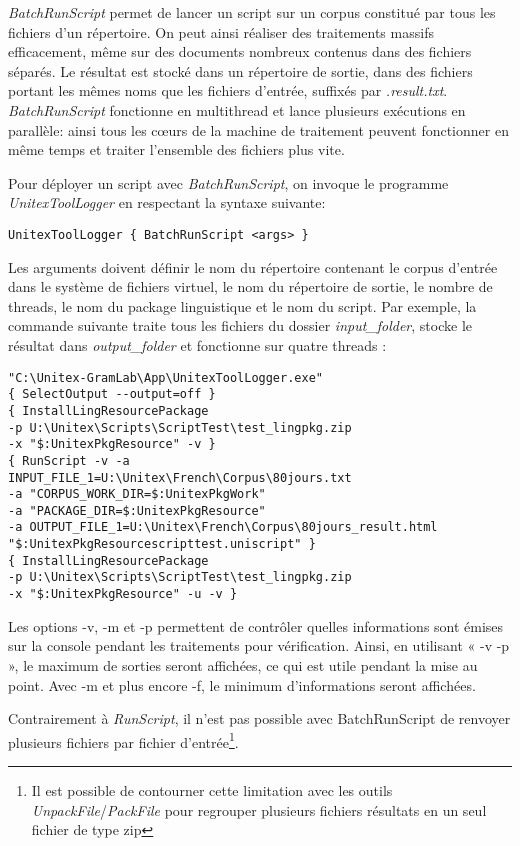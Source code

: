 \emph{BatchRunScript} permet de lancer un script sur un corpus constitué par tous les fichiers d'un répertoire. On peut ainsi réaliser des traitements massifs efficacement, même sur des documents nombreux contenus dans des fichiers séparés. Le résultat est stocké dans un répertoire de sortie, dans des fichiers portant les mêmes noms que les fichiers d'entrée, suffixés par \emph{.result.txt}. \emph{BatchRunScript} fonctionne en multithread et lance plusieurs exécutions en parallèle: ainsi tous les cœurs de la machine de traitement peuvent fonctionner en même temps et traiter l’ensemble des fichiers plus vite.

\bigskip
\noindent Pour déployer un script avec \emph{BatchRunScript}, on invoque le programme \emph{UnitexToolLogger} en respectant la syntaxe suivante:

\begin{verbatim}
UnitexToolLogger { BatchRunScript <args> }
\end{verbatim}

\bigskip
\noindent Les arguments doivent définir le nom du répertoire contenant le corpus d'entrée dans le système de fichiers virtuel, le nom du répertoire de sortie, le nombre de threads, le nom du package linguistique et le nom du script. Par exemple, la commande suivante traite tous les fichiers du dossier \emph{input\_folder}, stocke le résultat dans \emph{output\_folder} et fonctionne sur quatre threads :

\begin{verbatim}
"C:\Unitex-GramLab\App\UnitexToolLogger.exe" 
{ SelectOutput --output=off } 
{ InstallLingResourcePackage 
-p U:\Unitex\Scripts\ScriptTest\test_lingpkg.zip 
-x "$:UnitexPkgResource" -v } 
{ RunScript -v -a 
INPUT_FILE_1=U:\Unitex\French\Corpus\80jours.txt 
-a "CORPUS_WORK_DIR=$:UnitexPkgWork" 
-a "PACKAGE_DIR=$:UnitexPkgResource" 
-a OUTPUT_FILE_1=U:\Unitex\French\Corpus\80jours_result.html 
"$:UnitexPkgResourcescripttest.uniscript" } 
{ InstallLingResourcePackage 
-p U:\Unitex\Scripts\ScriptTest\test_lingpkg.zip 
-x "$:UnitexPkgResource" -u -v }
\end{verbatim}

\bigskip
\noindent Les options -v, -m et -p permettent de contrôler quelles informations sont émises sur la console pendant les traitements pour vérification. Ainsi, en utilisant « -v -p », le maximum de sorties seront affichées, ce qui est utile pendant la mise au point. Avec -m et plus encore -f, le minimum d’informations seront affichées.

\bigskip
\noindent Contrairement à \emph{RunScript}, il n'est pas possible avec BatchRunScript de renvoyer plusieurs fichiers par fichier d'entrée\footnote{Il est possible de contourner cette limitation avec les outils \emph{UnpackFile}/\emph{PackFile} pour regrouper plusieurs fichiers résultats en un seul fichier de type zip}.

